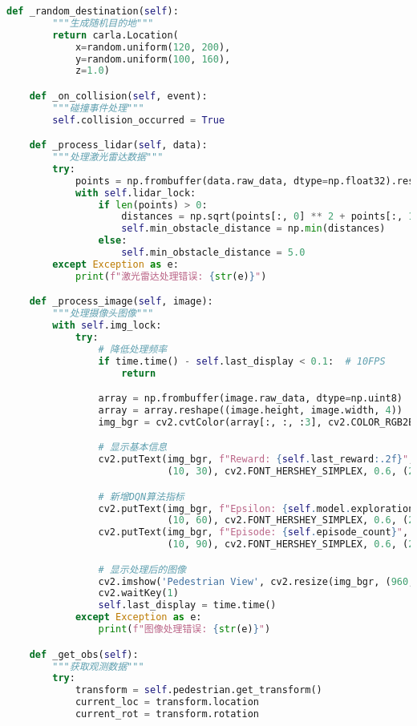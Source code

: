\begin{lstlisting}[language=Python]
    def _random_destination(self):
        """生成随机目的地"""
        return carla.Location(
            x=random.uniform(120, 200),
            y=random.uniform(100, 160),
            z=1.0)

    def _on_collision(self, event):
        """碰撞事件处理"""
        self.collision_occurred = True

    def _process_lidar(self, data):
        """处理激光雷达数据"""
        try:
            points = np.frombuffer(data.raw_data, dtype=np.float32).reshape(-1, 4)
            with self.lidar_lock:
                if len(points) > 0:
                    distances = np.sqrt(points[:, 0] ** 2 + points[:, 1] ** 2)
                    self.min_obstacle_distance = np.min(distances)
                else:
                    self.min_obstacle_distance = 5.0
        except Exception as e:
            print(f"激光雷达处理错误: {str(e)}")

    def _process_image(self, image):
        """处理摄像头图像"""
        with self.img_lock:
            try:
                # 降低处理频率
                if time.time() - self.last_display < 0.1:  # 10FPS
                    return

                array = np.frombuffer(image.raw_data, dtype=np.uint8)
                array = array.reshape((image.height, image.width, 4))
                img_bgr = cv2.cvtColor(array[:, :, :3], cv2.COLOR_RGB2BGR)

                # 显示基本信息
                cv2.putText(img_bgr, f"Reward: {self.last_reward:.2f}",
                            (10, 30), cv2.FONT_HERSHEY_SIMPLEX, 0.6, (255, 255, 255), 1)

                # 新增DQN算法指标
                cv2.putText(img_bgr, f"Epsilon: {self.model.exploration_rate:.2f}",
                            (10, 60), cv2.FONT_HERSHEY_SIMPLEX, 0.6, (255, 255, 255), 1)
                cv2.putText(img_bgr, f"Episode: {self.episode_count}",
                            (10, 90), cv2.FONT_HERSHEY_SIMPLEX, 0.6, (255, 255, 255), 1)

                # 显示处理后的图像
                cv2.imshow('Pedestrian View', cv2.resize(img_bgr, (960, 480)))
                cv2.waitKey(1)
                self.last_display = time.time()
            except Exception as e:
                print(f"图像处理错误: {str(e)}")

    def _get_obs(self):
        """获取观测数据"""
        try:
            transform = self.pedestrian.get_transform()
            current_loc = transform.location
            current_rot = transform.rotation


\end{lstlisting}
